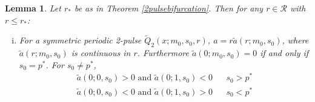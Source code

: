 \documentclass[10pt,reqno]{amsart}
\theoremstyle{plain}
\newtheorem{lemma}[theorem]{Lemma}
\theoremstyle{definition}
\theoremstyle{remark}
\numberwithin{theorem}{section}
\numberwithin{equation}{section}
\begin{document}
\begin{lemma}\label{lemma:chara}
Let $r_*$ be as in Theorem \ref{2pulsebifurcation}. Then for any $r \in \mathcal{R}$ with $r \leq r_*$:
\begin{enumerate}[(i)]
	\item For a symmetric periodic 2-pulse $\tilde{Q}_2(x; m_0, s_0, r)$, $a = r \tilde{a}(r; m_0, s_0)$, where $\tilde{a}(r; m_0, s_0)$ is continuous in $r$. Furthermore $\tilde{a}(0; m_0, s_0) = 0$ if and only if $s_0 = p^*$. For $s_0 \neq p^*$,
	\begin{equation}\label{symmsigns}
	\begin{aligned}
	\tilde{a}(0; 0, s_0) > 0 \text{ and } \tilde{a}(0; 1, s_0) < 0 && s_0 > p^* \\
	\tilde{a}(0; 0, s_0) < 0 \text{ and } \tilde{a}(0; 1, s_0) > 0 && s_0 < p^*
	\end{aligned}
	\end{equation}


\end{enumerate}
\end{lemma}
\end{document}
